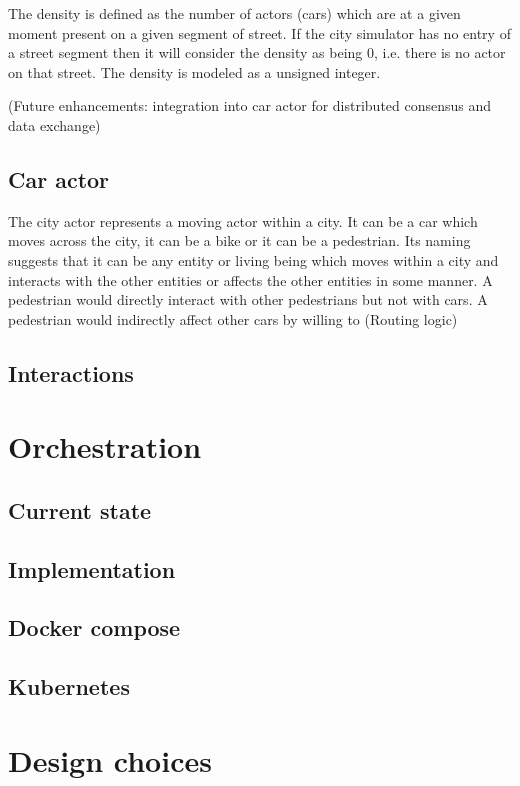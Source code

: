 \documentclass[conference]{IEEEtran}
\begin{document}
The density is defined as the number of actors (cars) which are at a given moment present on a given segment of street. If the city simulator has no entry of a street segment then it will consider the density as being 0, i.e. there is no actor on that street. The density is modeled as a unsigned integer.


(Future enhancements: integration into car actor for distributed consensus and data exchange)

\subsection{Car actor}
The city actor represents a moving actor within a city. It can be a car which moves across the city, it can be a bike or it can be a pedestrian. Its naming suggests that it can be any entity or living being which moves within a city and interacts with the other entities or affects the other entities in some manner. A pedestrian would directly interact with other pedestrians but not with cars. A pedestrian would indirectly affect other cars by willing to 
(Routing logic)

\subsection{Interactions}

\section{Orchestration}

\subsection{Current state}

\subsection{Implementation}

\subsection{Docker compose}

\subsection{Kubernetes}

\section{Design choices}
\end{document}
